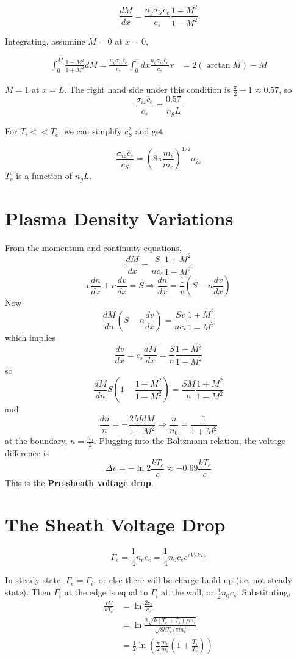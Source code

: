 \documentclass[12pt]{article}
\begin{document}
$$\frac{dM}{dx} = \frac{n_g\sigma_{\text{iz}}\overline c_e}{c_s} \frac{1+M^2}{1-M^2}$$

Integrating, assumine $M = 0$ at $x=0$,

\begin{align*}
    \int_0^M \frac{1-M^2}{1+M^2} dM = \frac{n_g\sigma_{iz}\overline c_e}{c_s} \int_0^x dx
    \frac{n_g\sigma_{iz}\overline c_e}{c_s} x &= 2(\arctan M) - M
\end{align*}

$M = 1$ at $x = L$. The right hand side under this condition is $\frac{\pi}{2} - 1 \approx 0.57$, so
$$\frac{\sigma_{iz}\overline c_e}{c_s} = \frac{0.57}{n_gL}$$

For $T_i << T_e$, we can simplify $c_S^2$ and get

$$\frac{\sigma_{iz}\overline c_e}{c_S} = \left(8\pi \frac{m_i}{m_e}\right)^{1/2}\sigma_{iz}$$
$T_e$ is a function of $n_gL$.

\section{Plasma Density Variations}

From the momentum and continuity equations,
$$\frac{dM}{dx} = \frac{S}{nc_s} \frac{1+M^2}{1-M^2}$$
$$v \frac{dn}{dx} + n \frac{dv}{dx} = S \Rightarrow \frac{dn}{dx} = \frac{1}{v} \left(S - n \frac{dv}{dx}\right)$$
Now
$$\frac{dM}{dn} \left(S - n \frac{dv}{dx}\right) = \frac{Sv}{nc_s} \frac{1+M^2}{1-M^2}$$
which implies
$$\frac{dv}{dx} = c_s \frac{dM}{dx} = \frac{S}{n} \frac{1+M^2}{1-M^2}$$
so
$$\frac{dM}{dn} S\left(1 - \frac{1+M^2}{1-M^2}\right) = \frac{SM}{n} \frac{1+M^2}{1-M^2}$$
and
$$\frac{dn}{n} = -\frac{2MdM}{1+M^2} \Rightarrow \frac{n}{n_0} = \frac{1}{1+M^2}$$
at the boundary, $n = \frac{n_0}{2}$. Plugging into the Boltzmann relation, the voltage difference is
$$\Delta v = -\ln 2 \frac{kT_e}{e} \approx -0.69 \frac{kT_e}{e}$$
This is the \textbf{Pre-sheath voltage drop}.

\section{The Sheath Voltage Drop}

$$\Gamma_e = \frac{1}{4} n_e\overline c_e = \frac{1}{4} n_0 \overline c_e e^{eV/kT_e}$$

In steady state, $\Gamma_e = \Gamma_i$, or else there will be charge build up (i.e. not steady state). Then $\Gamma_i$ at the edge is equal to $\Gamma_i$ at the wall, or $\frac{1}{2}n_0c_s$. Substituting,
\begin{align*}
    \frac{eV}{kT_e} &= \ln \frac{2c_s}{\overline c_e} \\
                    &= \ln \frac{2\sqrt{k(T_e +T_i)/m_i}}{\sqrt{8kT_e/\pi m_e}} \\
                    &= \frac{1}{2} \ln \left(\frac{\pi}{2} \frac{m_e}{m_i} \left(1 + \frac{T_i}{T_e}\right)\right)
\end{align*}
\end{document}
